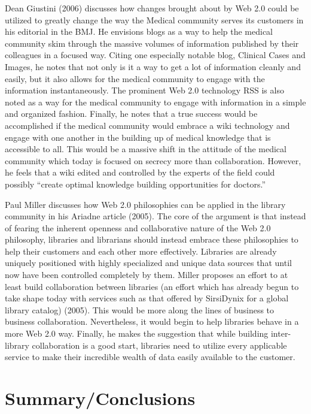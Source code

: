 \documentclass[12pt,oneside,letterpaper]{article}
\begin{document}
Dean Giustini (2006) discusses how changes brought about by Web 2.0 could be
utilized to greatly change the way the Medical community serves its customers in
his editorial in the BMJ.  He envisions blogs as a way to help the medical
community skim through the massive volumes of information published by their
colleagues in a focused way.  Citing one especially notable blog, Clinical Cases
and Images, he notes that not only is it a way to get a lot of information
cleanly and easily, but it also allows for the medical community to engage with
the information instantaneously.  The prominent Web 2.0 technology RSS is also
noted as a way for the medical community to engage with information in a simple
and organized fashion.  Finally, he notes that a true success would be
accomplished if the medical community would embrace a wiki technology and engage
with one another in the building up of medical knowledge that is accessible to
all.  This would be a massive shift in the attitude of the medical community
which today is focused on secrecy more than collaboration.  However, he feels
that a wiki edited and controlled by the experts of the field could possibly
``create optimal knowledge building opportunities for doctors.''

Paul Miller discusses how Web 2.0 philosophies can be applied in the library
community in his Ariadne article (2005).  The core of the argument is that
instead of fearing the inherent openness and collaborative nature of the Web 2.0
philosophy, libraries and librarians should instead embrace these philosophies
to help their customers and each other more effectively.  Libraries are already
uniquely positioned with highly specialized and unique data sources that until
now have been controlled completely by them.  Miller proposes an effort to at
least build collaboration between libraries (an effort which has already begun
to take shape today with services such as that offered by SirsiDynix for a
global library catalog) (2005).  This would be more along the lines of business
to business collaboration.  Nevertheless, it would begin to help libraries
behave in a more Web 2.0 way.  Finally, he makes the suggestion that while
building inter-library collaboration is a good start, libraries need to utilize
every applicable service to make their incredible wealth of data easily
available to the customer.

\section{Summary/Conclusions}
\end{document}
